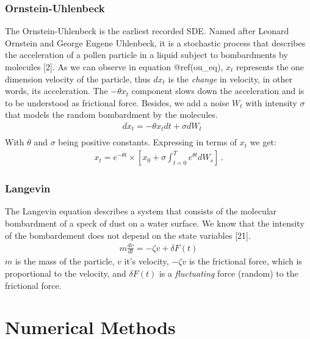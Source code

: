 \documentclass[12pt,twoside]{reedthesis}
\theoremstyle{definition}
\theoremstyle{definition}
\theoremstyle{remark}
\begin{document}
  \subsubsection{Ornstein-Uhlenbeck}\label{ornstein-uhlenbeck}
  
  The Ornstein-Uhlenbeck is the earliest recorded SDE. Named after Leonard
  Ornstein and George Eugene Uhlenbeck, it is a stochastic process that
  describes the acceleration of a pollen particle in a liquid subject to
  bombardments by molecules {[}2{]}. As we can observe in equation
  @ref(ou\_eq), \(x_t\) represents the one dimension velocity of the
  particle, thus \(dx_t\) is the \emph{change} in velocity, in other
  words, its acceleration. The \(- \theta x_t\) component slows down the
  acceleration and is to be understood as frictional force. Besides, we
  add a noise \(W_t\) with intensity \(\sigma\) that models the random
  bombardment by the molecules.
  \begin{align} \label{ou_eq}
  &d x_t = - \theta x_t dt + \sigma d W_t \\
  \end{align}
  With \(\theta\) and \(\sigma\) being positive constants. Expressing in
  terms of \(x_t\) we get:
  \begin{align}
  x_t = e^{-\theta t} \times \left[ x_0  + \sigma \int_{t=0}^{T} e^{\theta t} d W_s \right] \,.
  \end{align}
  \subsubsection{Langevin}\label{langevin}
  
  The Langevin equation describes a system that consists of the molecular
  bombardment of a speck of dust on a water surface. We know that the
  intensity of the bombardement does not depend on the state variables
  {[}21{]}.
  \begin{align}
  m \frac{dv}{dt} = -\zeta v + \delta F (t) 
  \end{align}
  \(m\) is the mass of the particle, \(v\) it's velocity, \(-\zeta v\) is
  the frictional force, which is proportional to the velocity, and
  \(\delta F (t)\) is a \emph{fluctuating} force (random) to the
  frictional force.
  
  \section{Numerical Methods}\label{numerical-methods}
  
\end{document}
